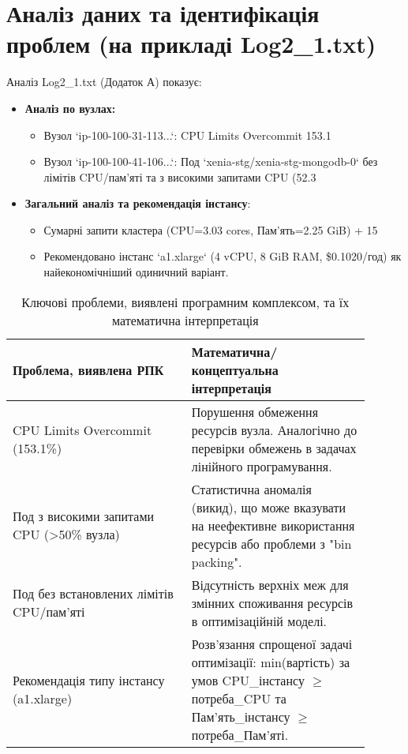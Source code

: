\section{Аналіз даних та ідентифікація проблем (на прикладі Log2\_1.txt)}
Аналіз Log2\_1.txt (Додаток А) показує:
\begin{itemize}
	\item \textbf{Аналіз по вузлах:}
	\begin{itemize}
		\item Вузол `ip-100-100-31-113...`: CPU Limits Overcommit 153.1%
		\item Вузол `ip-100-100-41-106...`: Под `xenia-stg/xenia-stg-mongodb-0` без лімітів CPU/пам'яті та з високими запитами CPU (52.3%
	\end{itemize}
	\item \textbf{Загальний аналіз та рекомендація інстансу}:
	\begin{itemize}
		\item Сумарні запити кластера (CPU=3.03 cores, Пам'ять=2.25 GiB) + 15%
		\item Рекомендовано інстанс `a1.xlarge` (4 vCPU, 8 GiB RAM, \$0.1020/год) як найекономічніший одиничний варіант.
	\end{itemize}
\end{itemize}

\begin{table}[h!]
	\centering
	\caption{Ключові проблеми, виявлені програмним комплексом, та їх математична інтерпретація}
	\label{tab:problems_interpretation}
	\begin{tabular}{@{}p{0.45\linewidth} p{0.45\linewidth}@{}}
		\toprule
		\textbf{Проблема, виявлена РПК} & \textbf{Математична/концептуальна інтерпретація} \\ 
		\midrule
		CPU Limits Overcommit (153.1\%) & Порушення обмеження ресурсів вузла. Аналогічно до перевірки обмежень в задачах лінійного програмування. \\ 
		\addlinespace
		Под з високими запитами CPU (>50\% вузла) & Статистична аномалія (викид), що може вказувати на неефективне використання ресурсів або проблеми з "bin packing". \\ 
		\addlinespace
		Под без встановлених лімітів CPU/пам'яті & Відсутність верхніх меж для змінних споживання ресурсів в оптимізаційній моделі. \\ 
		\addlinespace
		Рекомендація типу інстансу (a1.xlarge) & Розв'язання спрощеної задачі оптимізації: min(вартість) за умов CPU\_інстансу $\geq$ потреба\_CPU та Пам’ять\_інстансу $\geq$ потреба\_Пам’яті. \\ 
		\bottomrule
	\end{tabular}
\end{table}


